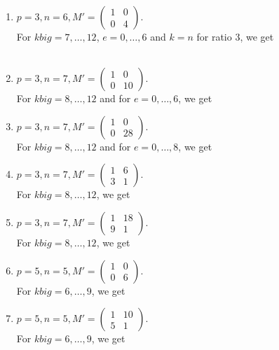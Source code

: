 \documentclass[letterpaper,12pt]{article}
\begin{document}
\begin{enumerate}
\item $p=3, n=6, M' = \begin{pmatrix}
1 & 0 \\ 0 & 4
\end{pmatrix}.$ \\
For $kbig = 7, \dots, 12$, $e = 0, \dots, 6$ and $k=n$ for ratio 3, we get \\
 \\

\item $p=3, n=7, M' = \begin{pmatrix}
1 & 0 \\ 0 & 10
\end{pmatrix}.$ \\
For $kbig = 8, \dots, 12$ and for $e = 0, \dots, 6$, we get \\

\item $p=3, n=7, M' = \begin{pmatrix}
1 & 0 \\ 0 & 28
\end{pmatrix}.$ \\
For $kbig = 8, \dots, 12$ and for $e = 0, \dots, 8$, we get \\

\item $p=3, n=7, M' = \begin{pmatrix}
1 & 6 \\ 3 & 1
\end{pmatrix}.$ \\
For $kbig = 8, \dots, 12$, we get \\

\item $p=3, n=7, M' = \begin{pmatrix}
1 & 18 \\ 9 & 1
\end{pmatrix}.$ \\
For $kbig = 8, \dots, 12$, we get \\

\item $p=5, n=5, M' = \begin{pmatrix}
1 & 0 \\ 0 & 6
\end{pmatrix}.$ \\
For $kbig = 6, \dots, 9$, we get \\

\item $p=5, n=5, M' = \begin{pmatrix}
1 & 10 \\ 5 & 1
\end{pmatrix}.$ \\
For $kbig = 6, \dots, 9$, we get \\

\end{enumerate}

\end{document}
